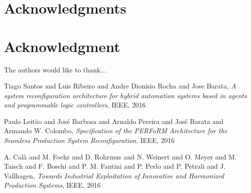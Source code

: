 \documentclass[conference,compsoc]{IEEEtran}
\begin{document}
\ifCLASSOPTIONcompsoc
  \section*{Acknowledgments}
\else
  \section*{Acknowledgment}
\fi

The authors would like to thank...

\begin{thebibliography}{1}

Tiago Santos and Luis Ribeiro and Andre Dionisio Rocha and Jose Barata, \emph{A system reconfiguration architecture for hybrid
automation systems based in agents and
programmable logic controllers}, IEEE, 2016

Paulo Leitão and José Barbosa and Arnaldo Pereira and José Barata  and Armando W. Colombo, \emph{Specification of the PERFoRM Architecture for the Seamless Production System Reconfiguration}, IEEE, 2016

A. Calà and M. Foehr and D. Rohrmus and N. Weinert and O. Meyer and M. Taisch and F. Boschi and P. M. Fantini and P. Perlo and P. Petrali and J. Vallhagen, \emph{Towards Industrial Exploitation of Innovative and Harmonized Production Systems}, IEEE, 2016
\end{thebibliography}

\end{document}
